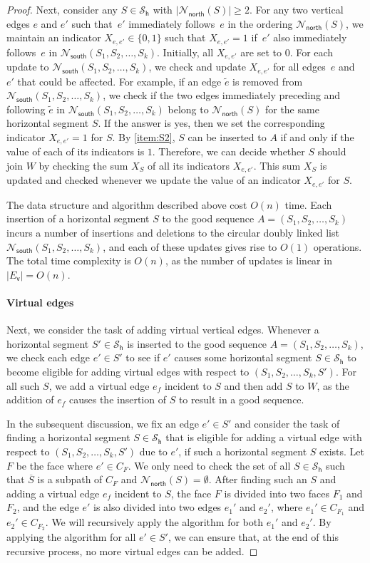 \documentclass{article}\usepackage[a4paper,margin=20mm]{geometry}
\newcommand{\EV}{E_\mathsf{v}}
\newcommand{\PH}{\mathcal{S}_\mathsf{h}}
\newcommand{\Nnorth}{\mathcal{N}_\mathsf{north}}
\newcommand{\Nsouth}{\mathcal{N}_\mathsf{south}}
\begin{document}
\begin{proof}
 Next, consider any $S \in \PH$ with $|\Nnorth(S)| \geq 2$. For any two vertical edges $e$ and $e'$ such that~$e'$ immediately follows~$e$ in the ordering $\Nnorth(S)$, we maintain an indicator $X_{e, e'} \in \{0,1\}$ such that $X_{e, e'} = 1$ if~$e'$ also immediately follows~$e$ in $\Nsouth(S_1, S_2, \ldots, S_{k})$. Initially, all $X_{e, e'}$ are set to $0$. For each update to $\Nsouth(S_1, S_2, \ldots, S_{k})$, we check and update $X_{e, e'}$ for all edges~$e$ and~$e'$ that could be affected. For example, if an edge $\tilde{e}$ is removed from $\Nsouth(S_1, S_2, \ldots, S_{k})$, we check if the two edges  immediately preceding and following $\tilde{e}$ in $\Nsouth(S_1, S_2, \ldots, S_{k})$ belong to $\Nnorth(S)$ for the same horizontal segment $S$. If the answer is yes, then we set the corresponding indicator $X_{e, e'}=1$ for $S$. 
 By \ref{item:S2}, $S$ can be inserted to $A$ if and only if the value of each of its indicators is $1$.
 Therefore, we can decide whether $S$ should join $W$ by checking the sum $X_S$ of all its indicators $X_{e, e'}$. This sum $X_S$ is updated and checked whenever we update the value of an indicator $X_{e, e'}$ for $S$.
 
 The data structure and algorithm described above cost $O(n)$ time. Each insertion of a horizontal segment $S$ to the good sequence $A=(S_1, S_2, \ldots, S_k)$ incurs a number of insertions and deletions to the circular doubly linked list $\Nsouth(S_1, S_2, \ldots, S_{k})$, and each of these updates gives rise to $O(1)$  operations. The total time complexity is $O(n)$, as the number of updates is linear in $|\EV|=O(n)$.
 
 \paragraph{Virtual edges}
 Next, we consider the task of adding virtual vertical edges. Whenever a horizontal segment $S' \in \PH$ is inserted to the good sequence $A=(S_1, S_2, \ldots, S_k)$, we check each edge $e' \in S'$ to see if $e'$ causes some horizontal segment $S \in \PH$ to become eligible for adding virtual edges with respect to $(S_1, S_2, \ldots, S_k, S')$. For all such $S$, we add a virtual edge $e_f$ incident to $S$ and then add $S$ to $W$, as the addition of $e_f$ causes the insertion of $S$ to result in a good sequence.
 
 In the subsequent discussion, we fix an edge $e' \in S'$ and consider the task of finding a horizontal segment $S \in \PH$ that is eligible for adding a virtual edge with respect to $(S_1, S_2, \ldots, S_k, S')$ due to $e'$, if such a horizontal segment $S$ exists. Let $F$ be the face where $e' \in C_F$. We only need to check the set of all $S \in \PH$ such that $\overline{S}$ is a subpath of $C_F$ and $\Nnorth(S) = \emptyset$. After finding such an $S$ and adding a virtual edge $e_f$ incident to $S$, the face $F$ is divided into two faces $F_1$ and $F_2$, and the edge $e'$ is also divided into two edges $e_1'$ and $e_2'$, where $e_1' \in C_{F_1}$ and $e_2' \in C_{F_2}$. We will recursively apply the algorithm for both $e_1'$ and $e_2'$. By applying the algorithm for all $e' \in S'$, we can ensure that, at the end of this recursive process, no more virtual edges can be added. 
 

\end{proof}
\end{document}
